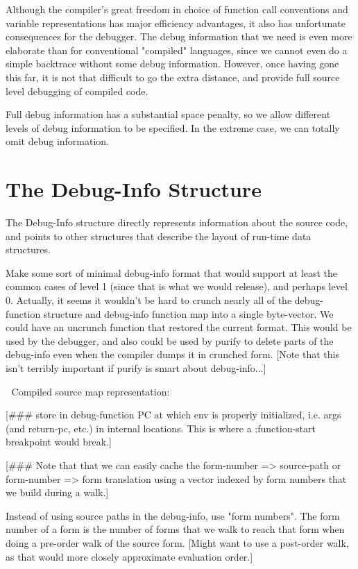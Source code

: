 Although the compiler's great freedom in choice of function call conventions
and variable representations has major efficiency advantages, it also has
unfortunate consequences for the debugger.  The debug information that we need
is even more elaborate than for conventional "compiled" languages, since we
cannot even do a simple backtrace without some debug information.  However,
once having gone this far, it is not that difficult to go the extra distance,
and provide full source level debugging of compiled code.

Full debug information has a substantial space penalty, so we allow different
levels of debug information to be specified.  In the extreme case, we can
totally omit debug information.


\section{The Debug-Info Structure}

The Debug-Info structure directly represents information about the
source code, and points to other structures that describe the layout of
run-time data structures.


Make some sort of minimal debug-info format that would support at least the
common cases of level 1 (since that is what we would release), and perhaps
level 0.  Actually, it seems it wouldn't be hard to crunch nearly all of the
debug-function structure and debug-info function map into a single byte-vector.
We could have an uncrunch function that restored the current format.  This
would be used by the debugger, and also could be used by purify to delete parts
of the debug-info even when the compiler dumps it in crunched form.
[Note that this isn't terribly important if purify is smart about
debug-info...]



Compiled source map representation:

[\#\#\# store in debug-function PC at which env is properly initialized, i.e.
args (and return-pc, etc.) in internal locations.  This is where a
:function-start breakpoint would break.]

[\#\#\# Note that that we can easily cache the form-number => source-path or
form-number => form translation using a vector indexed by form numbers that we
build during a walk.]




Instead of using source paths in the debug-info, use "form numbers".  The form
number of a form is the number of forms that we walk to reach that form when
doing a pre-order walk of the source form.  [Might want to use a post-order
walk, as that would more closely approximate evaluation order.]


